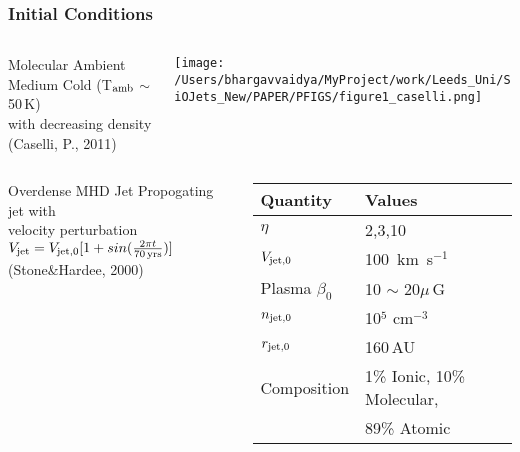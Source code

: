 \documentclass[8pt,xcolor=dvipsnames]{beamer}
\begin{document}
\begin{frame}
\frametitle{Initial Conditions}
\begin{columns}[T]
    \begin{column}{.4\textwidth}
     \begin{block}{Molecular Ambient Medium}
       Cold (T$_{\rm amb}$ $\sim$ 50\,K) \\ with decreasing density\\
       (\alert{Caselli, P., 2011})
       
    \end{block}
    \end{column}
    \begin{column}{.6\textwidth}  
      \texttt{[image: /Users/bhargavvaidya/MyProject/work/Leeds\_Uni/SiOJets\_New/PAPER/PFIGS/figure1\_caselli.png]}
    \end{column}
  \end{columns}
\vskip10pt 
\begin{columns}[T]
    \begin{column}{.4\textwidth}
     \begin{block}{Overdense MHD Jet}
       Propogating jet with \\ velocity perturbation \\
       $V_{\rm jet} = V_{\rm jet,0}[1 + sin(\frac{2\pi t}{70\, \rm
         yrs})]$\\
       (\alert{Stone\&Hardee, 2000})
    \end{block}
    \end{column}
    \begin{column}{.6\textwidth} 
      \hskip10pt
      \begin{tabular}{l l}
      \textbf{Quantity} & \textbf{Values}\\
      \hline\hline
      \smallskip
      $\eta$ & 2,3,10\\
      \smallskip
      $V_{\rm jet,0}$ & 100\, km\, s$^{-1}$\\
\smallskip
      Plasma $\beta_0$ & 10 $\sim$ 20$\mu$\,G \\
\smallskip
      $n_{\rm jet,0}$ & 10$^{5}$ cm$^{-3}$ \\
\smallskip
      $r_{\rm jet,0}$ & 160\,AU\\
\smallskip
      Composition & 1\% Ionic, 10\% Molecular,\\
      &89\% Atomic\\
      \hline
      \end{tabular}
    \end{column}
  \end{columns}


\end{frame}
\end{document}
